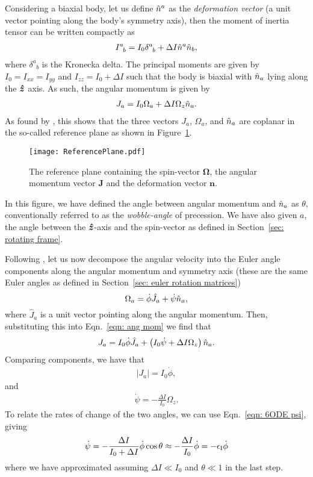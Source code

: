 \documentclass[../full_thesis/full_thesis.tex]{subfiles}
\begin{document}
Considering a biaxial body, let us define $\hat{n}^a$ as the \emph{deformation
vector} (a unit vector pointing along the body's symmetry axis), then the
moment of inertia tensor can be written compactly as
\begin{align}
I^{a}_{\;\;b} = I_{0} \delta^{a}_{\;\;b} + \Delta I \hat{n}^a \hat{n}_b,
\end{align}
where $\delta^{a}_{\;\;b}$ is the Kronecka delta. The principal moments are
given by $I_0=I_{xx}=I_{yy}$ and
$I_{zz} = I_0 + \Delta I$ such that the body is biaxial with $\hat{n}_{a}$ lying along
the $\boldsymbol{\hat{z}}$ axis. As such, the angular momentum is given by
\begin{align}
J_{a} = I_0 \Omega_a + \Delta I \Omega_z \hat{n}_a.
\label{eqn: ang mom}
\end{align}
As found by \citet{Pines1972}, this shows that the three vectors $J_a$,
$\Omega_a$, and $\hat{n}_a$ are coplanar in the so-called reference plane as shown in
Figure~\ref{fig: reference plane}.
\begin{figure}[htb]
    \texttt{[image: ReferencePlane.pdf]}
    \caption{The reference plane containing the spin-vector $\mathbf{\Omega}$,
    the angular momentum vector $\mathbf{J}$ and the deformation vector $\mathbf{n}$.}
    \label{fig: reference plane}
\end{figure}
In this figure, we have defined the angle between angular momentum and $\hat{n}_a$ as
$\theta$, conventionally referred to as the \emph{wobble-angle} of
precession. We have also given $a$, the angle between the $\boldsymbol{\hat{z}}$-axis and the
spin-vector as defined in Section~\ref{sec: rotating frame}.

Following \citet{Jones2001}, let us now decompose the angular velocity into the
Euler angle components along the angular momentum and symmetry axis (these
are the same Euler angles as defined in Section~\ref{sec: euler rotation
matrices})
\begin{equation}
  \Omega_a = \dot{\phi}\hat{J}_a + \dot{\psi}\hat{n}_{a},
\label{eqn: decomp}
\end{equation}
where $\hat{J}_a$ is a unit vector pointing along the angular momentum. Then,
substituting this into Eqn.~\eqref{eqn: ang mom} we find that
\begin{align}
J_a = I_0 \dot{\phi} \hat{J}_a + \left(I_0 \dot{\psi} + \Delta I \Omega_z\right)\hat{n}_a.
\end{align}
Comparing components, we have that
\begin{align}
|J_a| = I_0 \dot{\phi},
\end{align}
and
\begin{align}
\dot{\psi} = -\frac{\Delta I}{I_0} \Omega_z.
\end{align}
To relate the rates of change of the two angles, we can use Eqn.~\eqref{eqn:
6ODE psi}, giving
\begin{align}
\dot{\psi} = - \frac{\Delta I}{I_0 + \Delta I} \dot{\phi} \cos\theta
\approx -\frac{\Delta I}{I_0} \dot{\phi} = -\epsilon_{\mathrm{I}} \dot{\phi}
\label{eqn: psi phi}
\end{align}
where we have approximated assuming $\Delta I \ll I_0$ and $\theta \ll 1$ in
the last step.
\end{document}
